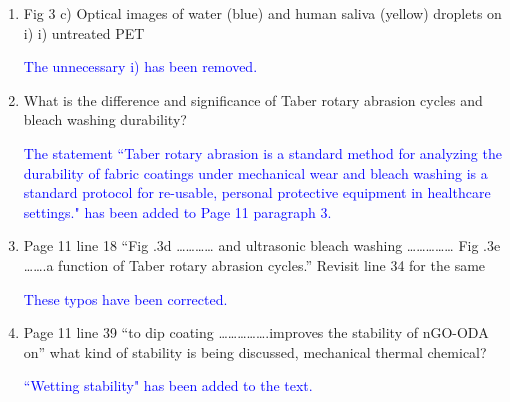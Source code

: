 \documentclass[12pt]{letter}
\newcommand{\blue}[1]{\textcolor{blue}{#1}} %
\begin{document}
\begin{enumerate}


\item   Fig 3 c) Optical images of water (blue) and human saliva (yellow) droplets on i) i) untreated PET

\blue{The unnecessary i) has been removed. }

\item   What is the difference and significance of Taber rotary abrasion cycles and bleach washing durability?

\blue{The statement ``Taber rotary abrasion is a standard method for analyzing the durability of fabric coatings under mechanical wear and bleach washing is a standard protocol for re-usable, personal protective equipment in healthcare settings." has been added to Page 11 paragraph 3.} 

\item   Page 11 line 18 “Fig .3d ………… and ultrasonic bleach washing …………… Fig .3e …….a function of Taber rotary abrasion cycles.” Revisit line 34 for the same

\blue{These typos have been corrected. }

\item  Page 11 line 39 “to dip coating …………….improves the stability of nGO-ODA on” what kind of stability is being discussed, mechanical thermal chemical?

\blue{``Wetting stability" has been added to the text. }


\end{enumerate}
\end{document}
